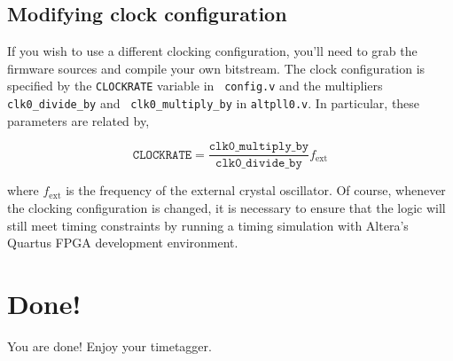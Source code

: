 \subsection{Modifying clock configuration}
\label{Sec:ModifyingClock}
If you wish to use a different clocking configuration, you'll need to
grab the firmware sources and compile your own bitstream. The clock
configuration is specified by the {\tt CLOCKRATE} variable in {\tt
config.v} and the multipliers {\tt clk0\_divide\_by} and {\tt
clk0\_multiply\_by} in {\tt altpll0.v}. In particular, these parameters
are related by,

\[ \mathtt{CLOCKRATE} = \frac{\mathtt{clk0\_multiply\_by}}{\mathtt{clk0\_divide\_by}} f_\mathrm{ext} \]

where $f_\mathrm{ext}$ is the frequency of the external crystal
oscillator. Of course, whenever the clocking configuration is changed,
it is necessary to ensure that the logic will still meet timing
constraints by running a timing simulation with Altera's Quartus FPGA
development environment.

\section{Done!}
You are done! Enjoy your timetagger.

\begin{comment}
\begin{figure}
  \center
  \texttt{[image: T.jpeg]}
  \caption{T the turtle says ``Hello!''.}
  \label{fig:T}
\end{figure}
\end{comment}

